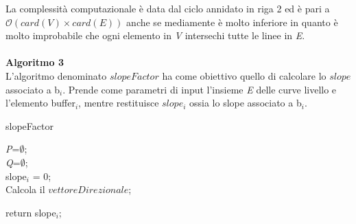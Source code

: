La complessità computazionale è data dal ciclo annidato in riga 2 ed è pari a $\mathcal{O}(card(\textit{V}) \times card(\textit{E}))$ anche se mediamente è molto inferiore in quanto è molto improbabile che ogni elemento in \textit{V} intersechi tutte le linee in \textit{E}.\\ 
\mbox{}\\
\newpage
\textbf{Algoritmo 3}\\
\newline
L'algoritmo denominato $slopeFactor$ ha come obiettivo quello di calcolare lo $slope$ associato a b$_i$. Prende come parametri di input l'insieme \textit{E} delle curve livello e l'elemento buffer$_i$, mentre restituisce $slope_i$ ossia lo slope associato a b$_i$.\\ 

\begin{algorithm}[H]
	

	\IncMargin{1em}
	\caption{slopeFactor}
	\label{alg:tre}
	\BlankLine
	
	\SetAlgoNoLine
	
    \textit{P}=$\emptyset$; \\
    \textit{Q}=$\emptyset$; \\
    slope$_i$ = $0$;\\
    Calcola il $vettoreDirezionale$;\\

	return slope$_{i}$; \\
	

\end{algorithm}
